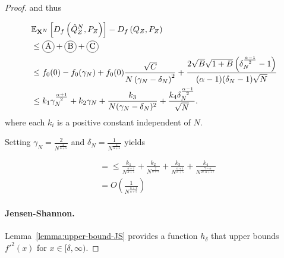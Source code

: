 \begin{proof}
and thus

\begin{align*}
    &\E_{\XN} \left[ D_f\left( \hat{Q}_Z^N , P_Z\right)\right] - D_f\left( Q_{Z} , P_Z\right)\\
    &\leq \encircle{A} + \encircle{B} + \encircle{C} \\
    &\leq f_0(0) - f_0(\gamma_N) + f_0(0) \frac{\sqrt{C}}{N \left( \gamma_N - \delta_N \right)^2} + \frac{2\sqrt{B}\sqrt{1+B}\left(\delta_N^\frac{\alpha-1}{2} - 1\right)}{(\alpha - 1) (\delta_N- 1) \sqrt{N}}\\
    &\leq k_1 \gamma_N^{\frac{\alpha+1}{2}} + k_2 \gamma_N + \frac{k_3}{N(\gamma_N - \delta_N)^2} + \frac{k_4 \delta_N^\frac{\alpha-1}{2}}{\sqrt{N}}.
\end{align*}
where each $k_i$ is a positive constant independent of $N$.

Setting $\gamma_N = \frac{2}{N^\frac{2}{\alpha+5}}$ and $\delta_N = \frac{1}{N^\frac{2}{\alpha+5}}$ yields

\begin{align*}
    &= \leq  \frac{k_1}{N^{\frac{\alpha+1}{\alpha+5}}} + \frac{k_2}{N^{\frac{2}{\alpha+5}}}
    + \frac{k_3}{N^{\frac{\alpha+1}{\alpha+5}}} 
    + \frac{k_4}{N^{\frac{7-\alpha}{2(\alpha+5)}}} \\
    & = O\left(\frac{1}{N^\frac{\alpha+1}{\alpha+5}} \right)
\end{align*}


\paragraph{Jensen-Shannon.}
Lemma~\ref{lemma:upper-bound-JS} provides a function $h_\delta$ that upper bounds $f'^2(x)$ for $x \in[\delta, \infty)$.


\end{proof}
